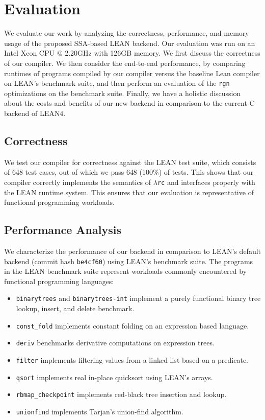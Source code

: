 \documentclass[conference]{IEEEtran}
\newcommand{\rgn}{\textcolor{pairedSixDarkRed}{\texttt{rgn}}}
\newcommand{\lambdarc}{\ensuremath{\lambda}\texttt{rc}}
\begin{document}
\section{Evaluation}

We evaluate our work by analyzing the correctness, performance, and memory
usage of the proposed SSA-based LEAN backend. Our evaluation was run
on an Intel Xeon CPU @ 2.20GHz with 126GB memory. We first
discuss the correctness of our compiler. We then consider the end-to-end
performance, by comparing runtimes of programs compiled by our compiler versus
the baseline Lean compiler on LEAN's benchmark suite, and then perform an
evaluation of the \rgn{} optimizations on the benchmark suite. Finally, we have
a holistic discussion about the costs and benefits of our new backend in
comparison to the current C backend of LEAN4.

\subsection{Correctness}

We test our compiler for correctness against the LEAN test suite, which
consists of 648 test cases, out of which we pass 648 (100\%) of tests.
This shows that our compiler correctly implements the semantics
of \lambdarc{} and interfaces properly with the LEAN runtime system.
This ensures that our evaluation is representative of functional
programming workloads.

\subsection{Performance Analysis}

We characterize the performance of our backend in comparison to LEAN's
default backend (commit hash \texttt{be4cf60}) using LEAN's benchmark
suite. The programs in the LEAN benchmark suite represent workloads commonly
encountered by functional programming languages:
\begin{itemize}
    \item \texttt{binarytrees} and \texttt{binarytrees-int}  implement a purely functional binary tree lookup, insert, and delete benchmark.
    \item \texttt{const\_fold}  implements constant folding on an expression based language.
    \item \texttt{deriv} benchmarks derivative computations on expression trees.
    \item \texttt{filter}  implements filtering values from a linked list based on a predicate.
    \item \texttt{qsort}  implements real in-place quicksort using LEAN's arrays.
    \item \texttt{rbmap\_checkpoint}  implements red-black tree insertion and lookup.
    \item \texttt{unionfind}  implements Tarjan's union-find algorithm.
\end{itemize}
\end{document}
